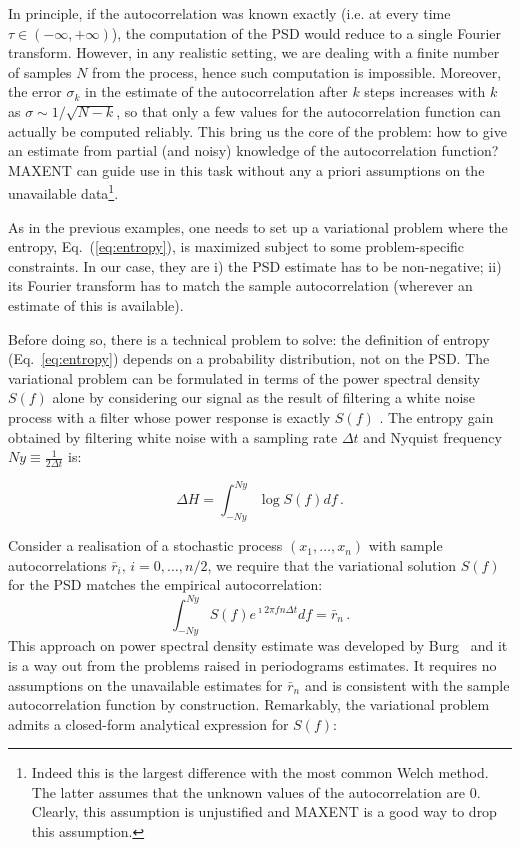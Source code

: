\documentclass[twocolumn,showpacs,preprintnumbers,nofootinbib,prd,
superscriptaddress,10pt]{revtex4-1}
\begin{document}
In principle, if the autocorrelation was known exactly (i.e. at every time $\tau \in (-\infty,+\infty)$), the computation of the PSD 
would reduce to a single Fourier transform.
However, in any realistic setting, we are dealing with a finite number of samples $N$ from the process, hence such computation
is impossible.
Moreover, the error $\sigma_k$ in the estimate of the autocorrelation after $k$ steps increases with $k$ as $\sigma \sim 1/\sqrt{N - k}$, so that only a few values for the autocorrelation function can actually be computed reliably.
This bring us the core of the problem: how to give an estimate from partial (and noisy) knowledge of the autocorrelation function? MAXENT can guide use in this task without any a priori assumptions on the unavailable data\footnote{Indeed this is the largest difference with the most common Welch method. The latter assumes that the unknown values of the autocorrelation are $0$. Clearly, this assumption is unjustified and MAXENT is a good way to drop this assumption.}.
\par
As in the previous examples, one needs to set up a variational problem where the entropy, Eq.~(\ref{eq:entropy}), is maximized 
subject to some problem-specific constraints. 
In our case, they are i) the PSD estimate has to be non-negative; ii) its Fourier transform has to match the sample autocorrelation (wherever an estimate of this is available).
\par
Before doing so, there is a technical problem to solve: the definition of entropy (Eq.~\ref{eq:entropy}) depends on a probability distribution, 
not on the PSD. The variational problem can be formulated in terms of the power spectral density $S(f)$ alone by
considering our signal as the result of filtering a white noise process with a filter whose power response is exactly $S(f)$ \cite{AblesMESA}. 
The entropy gain obtained by filtering white noise with a sampling rate $\Delta t$ and Nyquist frequency $Ny \equiv \frac{1}{2 \Delta t}$ is:

\begin{equation}\label{eq:EntropyGain}
    \Delta H = \int_{- Ny}^{Ny}\log S(f) df\,.
\end{equation}

Consider a realisation of a stochastic process $(x_1,\ldots,x_n)$ with sample autocorrelations $\bar r_i,\,i=0,\ldots, n/2$, we require that the variational solution $S(f)$ for the PSD matches the empirical autocorrelation:
\begin{equation}\label{eq:MaxConstraint}
\int_{-Ny}^{Ny} S(f) e^{\imath 2 \pi f n \Delta t} df = \bar r_{n}\,.
\end{equation}
This approach on power spectral density estimate was developed by Burg~\cite{burg1975maximum} and it is a way out from the problems raised in periodograms estimates. It requires no assumptions on the unavailable estimates for $\bar r_n$ and is consistent with the sample autocorrelation function by construction. Remarkably, the variational problem admits a closed-form analytical expression for $S(f)$:
\end{document}
